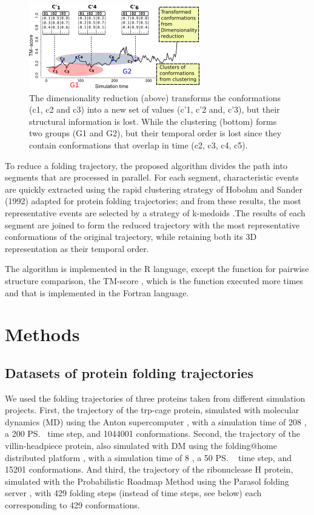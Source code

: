 \documentclass[american,twocolumn]{bmcart}
\begin{document}
\begin{figure}[th]
\includegraphics[bb=0bp 0bp 210bp 104bp,scale=1.05]{images/2RN2-trajectory-weakness}

\caption{ The dimensionality reduction (above) transforms the conformations (c1, c2 and c3) into a new set of values (c'1, c'2 and, c'3), but their structural information is lost. While the clustering (bottom) forms two groups (G1 and G2), but their temporal order is lost since they contain conformations that overlap in time (c2, c3, c4, c5). \label{fig:lost-info-dimensionality}}
\end{figure}

To reduce a folding trajectory, the proposed algorithm divides the path into segments that are processed in parallel. For each segment, characteristic events are quickly extracted using the rapid clustering strategy of Hobohm and Sander (1992) adapted for protein folding trajectories; and from these results, the most representative events are selected by a strategy of k-medoids \cite{Kaufman1990}.The results of each segment are joined to form the reduced trajectory with the most representative conformations of the original trajectory, while retaining both its 3D representation as their temporal order.

The algorithm is implemented in the R language, except the function for pairwise structure comparison, the TM-score \cite{Zhang2004}, which is the function executed more times and that is implemented in the Fortran language.

\section*{Methods}

\subsection*{Datasets of protein folding trajectories}

We used the folding trajectories of three proteins taken from different simulation projects. First, the trajectory of the trp-cage protein, simulated with molecular dynamics (MD) using the Anton supercomputer \cite{Shaw2011}, with a simulation time of 208 \us, a 200 \ps~time step, and 1044001 conformations. Second, the trajectory of the villin-headpiece protein, also simulated with DM using the folding@home distributed platform \cite{PandeEnsign07}, with a simulation time of 8 \us, a 50 \ps~ time step, and 15201 conformations. And third, the trajectory of the ribonuclease H protein, simulated with the Probabilistic Roadmap Method using the Parasol folding server \cite{Amato2010}, with 429 folding steps (instead of time steps, see below) each corresponding to 429 conformations. 
\end{document}
